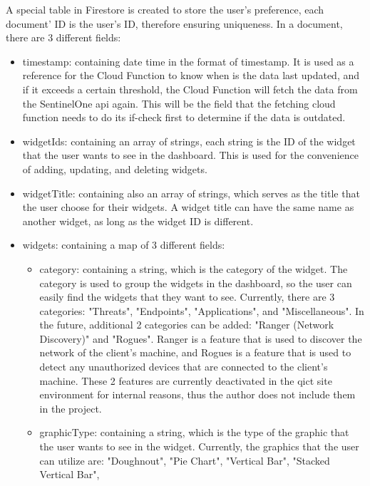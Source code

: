 \begin{multicols}{2}
  A special table in Firestore is created to store the user's preference, each document' ID is the user's ID, therefore ensuring
  uniqueness. In a document, there are 3 different fields:

  \begin{itemize}
    \item timestamp: containing date time in the format of timestamp. It is used as a reference for the Cloud Function to know when is
          the data last updated, and if it exceeds a certain threshold, the Cloud Function will fetch the data from the SentinelOne
          \acrshort{api} again. This will be the field that the fetching cloud function needs to do its if-check first to determine if
          the data is outdated.
    \item widgetIds: containing an array of strings, each string is the ID of the widget that the user wants to see in the dashboard.
          This is used for the convenience of adding, updating, and deleting widgets.
    \item widgetTitle: containing also an array of strings, which serves as the title that the user choose for their widgets. A widget
          title can have the same name as another widget, as long as the widget ID is different.
    \item widgets: containing a map of 3 different fields:
          \begin{itemize}
            \item category: containing a string, which is the category of the widget. The category is used to group the widgets in the
                  dashboard, so the user can easily find the widgets that they want to see. Currently, there are 3 categories: "Threats",
                  "Endpoints", "Applications", and "Miscellaneous". In the future, additional 2 categories can be added: "Ranger
                  (Network Discovery)" and "Rogues". Ranger is a feature that is used to discover the network of the client's machine,
                  and Rogues is a feature that is used to detect any unauthorized devices that are connected to the client's machine.
                  These 2 features are currently deactivated in the \acrshort{qict} site environment for internal reasons, thus the
                  author does not include them in the project.
            \item graphicType: containing a string, which is the type of the graphic that the user wants to see in the widget. Currently,
                  the graphics that the user can utilize are: "Doughnout", "Pie Chart", "Vertical Bar", "Stacked Vertical Bar",

\end{itemize}
\end{itemize}
\end{multicols}
